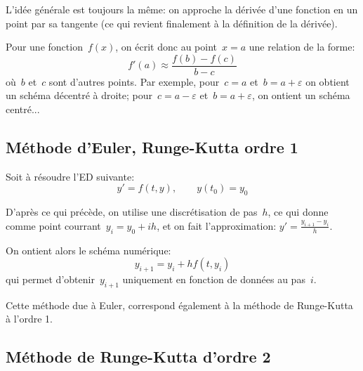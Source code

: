 \medskip
L'idée générale est toujours la même: on approche la dérivée d'une
fonction en un point par sa tangente (ce qui revient finalement à la définition 
de la dérivée).

Pour une fonction~$f(x)$, on écrit donc au point~$x=a$ une relation de la forme:
\begin{equation}
f'(a)\approx \frac{f(b)-f(c)}{b-c}
\end{equation}
où~$b$ et~$c$ sont d'autres points.
Par exemple, pour~$c=a$ et~$b=a+\varepsilon$ on obtient un schéma décentré
à droite; pour~$c=a-\varepsilon$ et~$b=a+\varepsilon$, on ontient un schéma
centré...


\medskip
\subsection{Méthode d'Euler, Runge-Kutta ordre 1}

Soit à résoudre l'ED suivante:
\begin{equation}
  y' = f(t, y), \qquad y(t_0) = y_0 
\end{equation}

\medskip
D'après ce qui précède, on utilise une discrétisation de pas~$h$, ce qui
donne comme point courrant~$y_i=y_0+ih$, et on fait l'approximation:
$y'=\frac{y_{i+1}-y_i}h$.

On ontient alors le schéma numérique:
\begin{equation}
y_{i+1}=y_i+hf(t,y_i)
\end{equation}
qui permet d'obtenir~$y_{i+1}$ uniquement en fonction de données
au pas~$i$.

\medskip
Cette méthode due à Euler, correspond également à la méthode
de Runge-Kutta à l'ordre 1.


\medskip
\subsection{Méthode de Runge-Kutta d'ordre 2}

